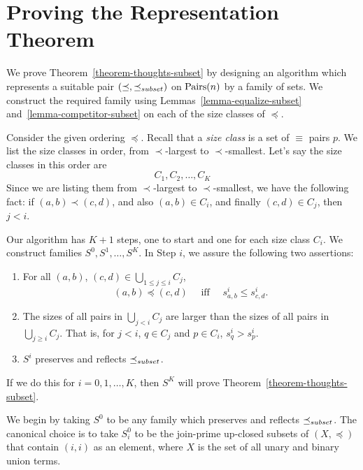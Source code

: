 \documentclass[12pt]{article}
\theoremstyle{definition}
\newcommand{\quadiff}{\quad \mbox{ iff } \quad}
\begin{document}
\section{Proving the Representation Theorem}

We prove Theorem~\ref{theorem-thoughts-subset} by designing an algorithm
which represents a suitable pair $(\preceq,\preceq_{\scriptsize subset})$ on $\mbox{Pairs}(n)$ by a family
of sets.   We construct the required family using Lemmas~\ref{lemma-equalize-subset}
and~\ref{lemma-competitor-subset} on each of the 
size classes of $\preceq$.


Consider the given ordering $\preceq$.
Recall that a \emph{size class} is a set of $\equiv$
 pairs $p$.   We list the size classes in order, from $\prec$-largest to 
 $\prec$-smallest.   Let's say the size classes in this order are 
 \[  C_1, C_2, \ldots, C_K \]
 Since we are listing them from 
 $\prec$-largest to 
 $\prec$-smallest, we have the following fact:
 if $(a,b) \prec (c,d)$, and also  $(a,b)\in C_i$, and finally
 $(c,d)\in C_j$,
 then $j < i$.
 
 Our algorithm has $K+1$ steps, one to start
 and one for each size class $C_i$. 
 We construct families $S^0, S^1, \ldots, S^K$.
 In Step $i$,
 we assure the following two assertions:
 \begin{enumerate}
 \item For all $(a,b)$, $(c,d)\in \bigcup_{1\leq j\leq i} C_j$,
\begin{equation}
    \label{goal-in-alg}
 (a,b) \preceq  (c,d) \quadiff 
 s^i_{a,b}\leq s^i_{c,d}.
 \end{equation}
     \item 
The sizes of all pairs in $\bigcup_{j< i} C_j$ are larger than the sizes of all pairs in $\bigcup_{j\geq i} C_j$.
   That is, for  $j < i$, $q\in C_j$ and $p\in C_i$, $s^i_q > s^i_p$.
   \item $S^i$ preserves and reflects $\preceq_{\scriptsize subset}$.
 \end{enumerate}
 If we do this for $i = 0, 1, \ldots, K$, then $S^K$ will
 prove Theorem~\ref{theorem-thoughts-subset}.
 
 We begin by taking $S^0$ to be any family
 which preserves and reflects $\preceq_{\scriptsize subset}$.
 The canonical choice is to take $S^0_i$ to be the join-prime up-closed
 subsets of $(X,\preceq)$ that contain $(i,i)$ as an element, where $X$ is the set of all unary and binary union terms.
 
\end{document}
